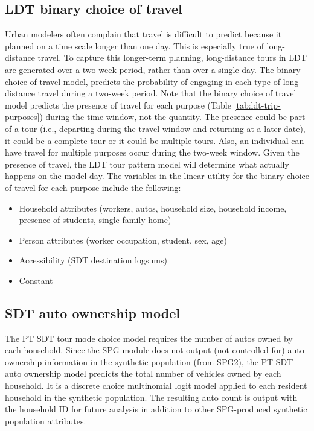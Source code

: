 \subsection{LDT binary choice of travel}
Urban modelers often complain that travel is difficult to predict because it planned on a time scale longer than one day. This is especially true of long-distance travel. To capture this longer-term planning, long-distance tours in LDT are generated over a two-week period, rather than over a single day. The binary choice of travel model, predicts the probability of engaging in each type of long-distance travel during a two-week period. Note that the binary choice of travel model predicts the presence of travel for each purpose (Table \ref{tab:ldt-trip-purposes}) during the time window, not the quantity. The presence could be part of a tour (i.e., departing during the travel window and returning at a later date), it could be a complete tour or it could be multiple tours. Also, an individual can have travel for multiple purposes occur during the two-week window. Given the presence of travel, the LDT tour pattern model will determine what actually happens on the model day. The variables in the linear utility for the binary choice of travel for each purpose include the following:
\begin{itemize}
\item Household attributes (workers, autos, household size, household income, presence of students, single family home)
\item Person attributes (worker occupation, student, sex, age)
\item Accessibility (SDT destination logsums)
\item Constant
\end{itemize}

\subsection{SDT auto ownership model}\label{sec:sdt-auto-ownership}
The PT SDT tour mode choice model requires the number of autos owned by each household. Since the SPG module does not output (not controlled for) auto ownership information in the synthetic population (from SPG2), the PT SDT auto ownership model predicts the total number of vehicles owned by each household. It is a discrete choice multinomial logit model applied to each resident household in the synthetic population. The resulting auto count is output with the household ID for future analysis in addition to other SPG-produced synthetic population attributes. 

